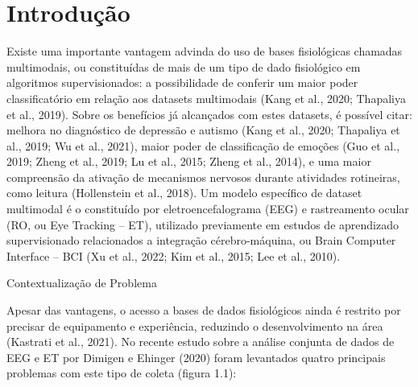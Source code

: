 \documentclass[a4paper, 12pt]{ppgeb}
\makeatletter
\renewcommand{\section}{\@startsection
{section}
{1}
{0mm}
{-\baselineskip}
{0.5\baselineskip}
{\large\bfseries\scshape}}
\makeatother
\begin{document}
\begin{acronym}
\end{acronym}

\clearpage


\acresetall %

\chapter{Introdução}

Existe uma importante vantagem advinda do uso de bases fisiológicas chamadas multimodais, ou constituídas de mais de um tipo de dado fisiológico em algoritmos supervisionados: a possibilidade de conferir um maior poder classificatório em relação aos datasets multimodais (Kang et al., 2020; Thapaliya et al., 2019). Sobre os benefícios já alcançados com estes datasets, é possível citar: melhora no diagnóstico de depressão e autismo (Kang et al., 2020; Thapaliya et al., 2019; Wu et al., 2021), maior poder de classificação de emoções (Guo et al., 2019; Zheng et al., 2019; Lu et al., 2015; Zheng et al., 2014), e uma maior compreensão da ativação de mecanismos nervosos durante atividades rotineiras, como leitura (Hollenstein et al., 2018). Um modelo específico de dataset multimodal é o constituído por eletroencefalograma (EEG) e rastreamento ocular (RO, ou Eye Tracking – ET), utilizado previamente em estudos de aprendizado supervisionado relacionados a integração cérebro-máquina, ou Brain Computer Interface – BCI (Xu  et  al.,  2022;  Kim  et  al., 2015; Lee et al., 2010).


\section{Contextualização de Problema}

Apesar das vantagens, o acesso a bases de dados fisiológicos ainda é restrito por precisar de equipamento e experiência, 
reduzindo o desenvolvimento na área (Kastrati et al., 2021). No recente estudo sobre a análise conjunta de dados de EEG e ET por 
Dimigen e Ehinger (2020) foram levantados quatro principais problemas com este tipo de coleta (figura 1.1):
\end{document}
